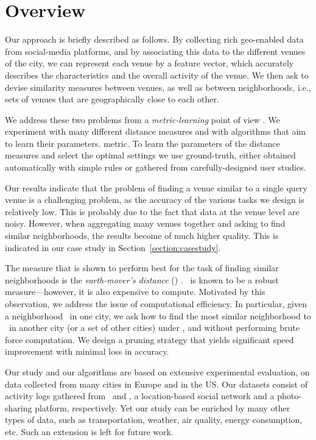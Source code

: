 \section{Overview}
\label{sec:overview}

Our approach is briefly described as follows.  By collecting rich geo-enabled
data from social-media platforms, and by associating this data to the different
venues of the city, we can represent each venue by a feature vector, which
accurately describes the characteristics and the overall activity of the venue.
We then ask to devise similarity measures between venues, as well as between
neighborhoods, i.e., sets of venues that are geographically close to each
other. 

We address these two problems from a {\em metric-learning} point of view
\cite{MetricSurvey13}.  We experiment with many different distance measures
and with algorithms that aim to learn their parameters. %
metric.  To learn the parameters of the distance measures and select the
optimal settings we use ground-truth, either obtained automatically with simple
rules or gathered from carefully-designed user studies. 

Our results indicate that the problem of finding a venue similar to a single
query venue is a challenging problem, as the accuracy of the various tasks we
design is relatively low.  This is probably due to the fact that data at the
venue level are noisy.  However, when aggregating many venues together and
asking to find similar neighborhoods, the results become of much higher
quality.  This is indicated in our case study in
Section~\ref{section:casestudy}.

The  measure that is shown to perform best for the task of finding similar
neighborhoods is the {\em earth-mover's distance} (\emd) \cite{EMD98}.  \emd\
is known to be a robust measure---however, it is also expensive to compute.
Motivated by this observation, we address the issue of computational
efficiency.  In particular,  given a neighborhood \region\ in one city, we ask
how to find the most similar neighborhood to \region\ in another city (or a set
of other cities) under \emd, and without performing brute force computation.
We design a pruning strategy that yields significant speed improvement with
minimal loss in accuracy. 

Our study and our algorithms are based on extensive experimental evaluation, on
data collected from many cities in Europe and in the US.  Our datasets consist
of activity logs gathered from \fs\ and \flickr, a location-based social
network and a photo-sharing platform, respectively.  Yet our study can be
enriched by many other types of data, such as transportation, weather, air
quality, energy consumption, etc.  Such an extension is left for future work.

